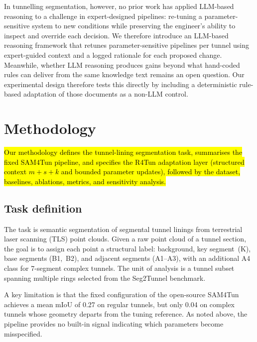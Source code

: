 \documentclass[a4paper,fleqn]{cas-dc}
\begin{document}
{In tunnelling segmentation, however, no prior work has applied LLM-based reasoning to a challenge in expert-designed pipelines: re-tuning a parameter-sensitive system to new conditions while preserving the engineer's ability to inspect and override each decision. We therefore introduce an LLM-based reasoning framework that retunes parameter-sensitive pipelines per tunnel using expert-guided context and a logged rationale for each proposed change. Meanwhile, whether LLM reasoning produces gains beyond what hand-coded rules can deliver from the same knowledge text remains an open question. Our experimental design therefore tests this directly by including a deterministic rule-based adaptation of those documents as a non-LLM control.




\section{Methodology}\label{sec:methods}

\hl{Our methodology defines the tunnel-lining segmentation task, summarises the fixed SAM4Tun pipeline, and specifies the R4Tun adaptation layer (structured context \mbox{$m+s+k$} and bounded parameter updates), followed by the dataset, baselines, ablations, metrics, and sensitivity analysis.}

\subsection{Task definition}\label{sec:problem-def}

The task is semantic segmentation of segmental tunnel linings from terrestrial laser scanning (TLS) point clouds. Given a raw point cloud of a tunnel section, the goal is to assign each point a structural label: background, key segment~(K), base segments (B1,~B2), and adjacent segments (A1--A3), with an additional A4 class for 7-segment complex tunnels. The unit of analysis is a tunnel subset spanning multiple rings selected from the Seg2Tunnel benchmark. 

A key limitation is that the fixed configuration of the open-source SAM4Tun achieves a mean mIoU of 0.27 on regular tunnels, but only 0.04 on complex tunnels whose geometry departs from the tuning reference. As noted above, the pipeline provides no built-in signal indicating which parameters become misspecified.

}
\end{document}

